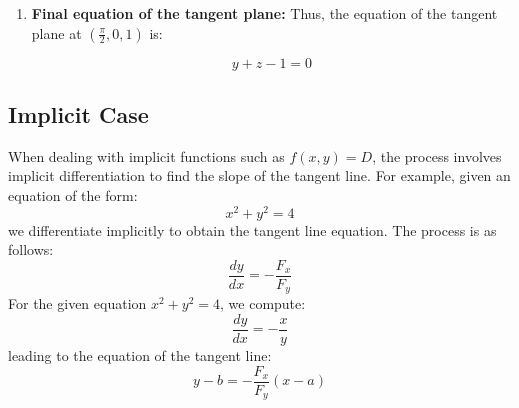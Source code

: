 \documentclass{report}
\begin{document}
{\begin{enumerate}
		      \[
			      0 \cdot (x - \frac{\pi}{2}) + 1 \cdot (y - 0) + z - 1 = 0
		      \]

		      Simplifying the equation:

		      \[
			      y + z - 1 = 0
		      \]

		\item \textbf{Final equation of the tangent plane:}
		      Thus, the equation of the tangent plane at \( \left( \frac{\pi}{2}, 0, 1 \right) \) is:

		      \[
			      y + z - 1 = 0
		      \]

	\end{enumerate}

}

\begin{center}
\end{center}

\subsection{Implicit Case}

When dealing with implicit functions such as \(f(x, y) = D\), the process involves implicit differentiation to find the slope of the tangent line. For example, given an equation of the form:
\[
	x^2 + y^2 = 4
\]
we differentiate implicitly to obtain the tangent line equation. The process is as follows:
\[
	\frac{dy}{dx} = -\frac{F_x}{F_y}
\]
For the given equation \(x^2 + y^2 = 4\), we compute:
\[
	\frac{dy}{dx} = -\frac{x}{y}
\]
leading to the equation of the tangent line:
\[
	y - b = -\frac{F_x}{F_y}(x - a)
\]

\end{document}
